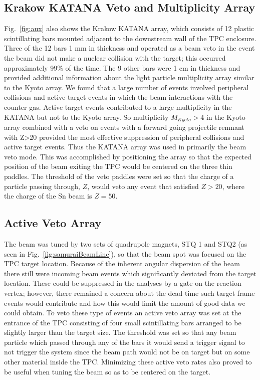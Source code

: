 \subsection{Krakow KATANA Veto and Multiplicity Array}
 Fig.~\ref{fig:aux} also shows the Krakow KATANA array, which consists of 12 plastic scintillating bars mounted adjacent to the downstream wall of the TPC enclosure. Three of the 12 bars 1 mm in thickness and operated as a beam veto in the event the beam did not make a nuclear collision with the target; this occurred approximately 99\% of the time. The 9 other bars were 1 cm in thickness and provided additional information about the light particle multiplicity array similar to the Kyoto array. We found that a large number of events involved peripheral collisions and active target events in which the beam interactions with the counter gas. Active target events contributed to a large multiplicity in the KATANA but not to the Kyoto array. So multiplicity $M_{Kyoto} > 4$ in the Kyoto array combined with a veto on events with a forward going projectile remnant with Z>20 provided the most effective suppression of peripheral collisions and active target events. Thus the KATANA array was used in primarily the beam veto mode. This was accomplished by positioning the array so that the expected position of the beam exiting the TPC would be centered on the three thin paddles. The threshold of the veto paddles were set so that the charge of a particle passing through, $Z$, would veto any event that satisfied $Z > 20$, where the charge of the Sn beam is $Z=50$. 


\subsection{Active Veto Array}
The beam was tuned by two sets of quadrupole  magnets, STQ 1 and STQ2 (as seen in Fig.~\ref{fig:samuraiBeamLine}), so that the beam spot was focused on the TPC target location. Because of the inherent angular dispersion of the beam there still were incoming beam events which significantly deviated from the target location. These could be suppressed in the analyses by a gate on the reaction vertex; however, there remained a concern about the dead time such target frame events would contribute and how this would limit the amount of good data we could obtain.  To veto these type of events an active veto array was set at the entrance of the TPC consisting of four small scintillating bars arranged to be slightly larger than the target size. The threshold was set so that any beam particle which passed through any of the bars it would send a trigger signal to not trigger the system since the beam path would not be on target but on some other material inside the TPC. Minimizing these active veto rates also proved to be useful when tuning the beam so as to be centered on the target.


